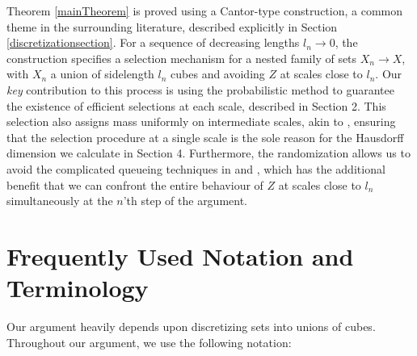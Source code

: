 \documentclass[dvipsnames,letterpaper,12pt]{article}
\numberwithin{equation}{section}
\theoremstyle{plain}
\begin{document}
Theorem \ref{mainTheorem} is proved using a Cantor-type construction, a common theme in the surrounding literature, described explicitly in Section \ref{discretizationsection}. For a sequence of decreasing lengths $l_n \to 0$, the construction specifies a selection mechanism for a nested family of sets $X_n \to X$, with $X_n$ a union of sidelength $l_n$ cubes and avoiding $Z$ at scales close to $l_n$. Our {\it key} contribution to this process is using the probabilistic method to guarantee the existence of efficient selections at each scale, described in Section 2. This selection also assigns mass uniformly on intermediate scales, akin to \cite{MalabikaRob}, ensuring that the selection procedure at a single scale is the sole reason for the Hausdorff dimension we calculate in Section 4. Furthermore, the randomization allows us to avoid the complicated queueing techniques in \cite{KeletiDimOneSet} and \cite{MalabikaRob}, which has the additional benefit that we can confront the entire behaviour of $Z$ at scales close to $l_n$ simultaneously at the $n$'th step of the argument.










\section{Frequently Used Notation and Terminology}\label{notationSection}

Our argument heavily depends upon discretizing sets into unions of cubes. Throughout our argument, we use the following notation:

\end{document}
